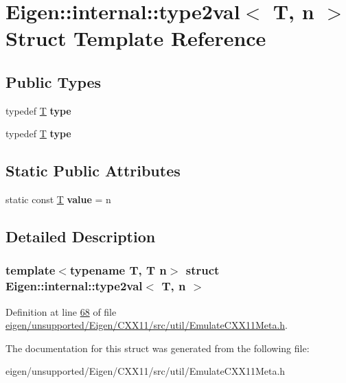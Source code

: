 \hypertarget{struct_eigen_1_1internal_1_1type2val}{}\section{Eigen\+:\+:internal\+:\+:type2val$<$ T, n $>$ Struct Template Reference}
\label{struct_eigen_1_1internal_1_1type2val}
\subsection*{Public Types}
\begin{DoxyCompactItemize}
\item 
\mbox{\label{struct_eigen_1_1internal_1_1type2val_a047c201ed17d86866a0ede17a70e5943}} 
typedef \hyperlink{group___sparse_core___module}{T} {\bfseries type}
\item 
\mbox{\label{struct_eigen_1_1internal_1_1type2val_a047c201ed17d86866a0ede17a70e5943}} 
typedef \hyperlink{group___sparse_core___module}{T} {\bfseries type}
\end{DoxyCompactItemize}
\subsection*{Static Public Attributes}
\begin{DoxyCompactItemize}
\item 
\mbox{\label{struct_eigen_1_1internal_1_1type2val_a7e07db9e21829b36ae6ad3f14ea80531}} 
static const \hyperlink{group___sparse_core___module}{T} {\bfseries value} = n
\end{DoxyCompactItemize}


\subsection{Detailed Description}
\subsubsection*{template$<$typename T, T n$>$\newline
struct Eigen\+::internal\+::type2val$<$ T, n $>$}



Definition at line \hyperlink{eigen_2unsupported_2_eigen_2_c_x_x11_2src_2util_2_emulate_c_x_x11_meta_8h_source_l00068}{68} of file \hyperlink{eigen_2unsupported_2_eigen_2_c_x_x11_2src_2util_2_emulate_c_x_x11_meta_8h_source}{eigen/unsupported/\+Eigen/\+C\+X\+X11/src/util/\+Emulate\+C\+X\+X11\+Meta.\+h}.



The documentation for this struct was generated from the following file\+:\begin{DoxyCompactItemize}
\item 
eigen/unsupported/\+Eigen/\+C\+X\+X11/src/util/\+Emulate\+C\+X\+X11\+Meta.\+h\end{DoxyCompactItemize}
